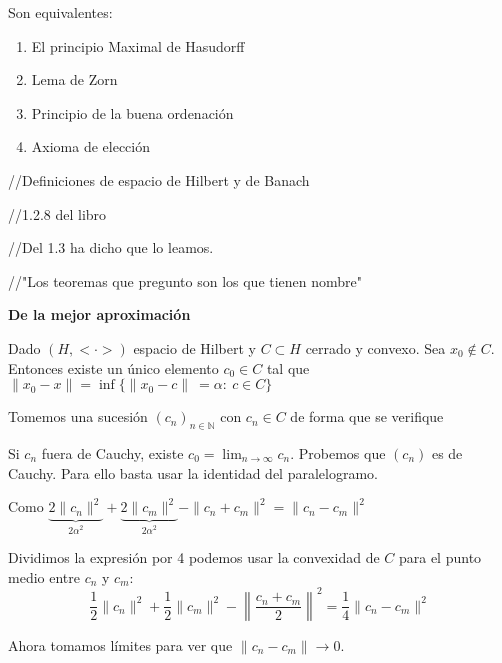 \documentclass[openany]{book}
\begin{document}
\newpage
\begin{theorem}
    Son equivalentes:
    \begin{enumerate}
        \item El principio Maximal de Hasudorff
        \item Lema de Zorn
        \item Principio de la buena ordenación
        \item Axioma de elección
    \end{enumerate}
\end{theorem}

//Definiciones de espacio de Hilbert y de Banach


//1.2.8 del libro

//Del 1.3 ha dicho que lo leamos.

//"Los teoremas que pregunto son los que tienen nombre"


\begin{theorem}
    \textbf{De la mejor aproximación}

    Dado $ (H,<\cdot >) $ espacio de Hilbert y $ C \subset H $ cerrado y convexo. Sea $ x_0 \not  \in C $. Entonces existe un único elemento $ c_0 \in C $ tal que $ \|x_0-x\| = \inf \{\|x_0-c\|\ = \alpha :\ c \in C\} $

\end{theorem}

\begin{demonstration}
    Tomemos una sucesión $(c_n)_{n \in \mathbb{N}}$ con $ c_n \in C $ de forma que se verifique 



    Si $ c_n $ fuera de Cauchy, existe $ c_0 = \lim_{n \to \infty} c_n $. Probemos que $ (c_n) $ es de Cauchy. Para ello basta usar la identidad del paralelogramo.

    Como $ \underbrace{2\|c_n\|^2}_{2 \alpha ^2}+ \underbrace{2\|c_m\|^2}_{2 \alpha ^2}-\|c_n+c_m\|^2 = \|c_n-c_m\|^2 $

    Dividimos la expresión por 4 podemos usar la convexidad de $ C $ para el punto medio entre $ c_n $ y $ c_m $:
    $$ \dfrac{1}{2}\|c_n\|^2 + \dfrac{1}{2}\|c_m\|^2 - \left\|\dfrac{c_n+c_m}{2}\right\| ^2= \dfrac{1}{4}\|c_n-c_m\|^2 $$

    Ahora tomamos límites para ver que $ \|c_n-c_m\| \to 0 $.

\end{demonstration}
\end{document}
